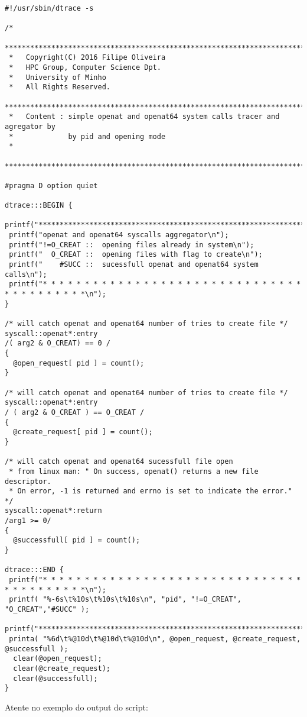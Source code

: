\documentclass[a4paper]{article}
\begin{document}
\begin{lstlisting}
#!/usr/sbin/dtrace -s

/*
 ********************************************************************************
 *   Copyright(C) 2016 Filipe Oliveira
 *   HPC Group, Computer Science Dpt.
 *   University of Minho
 *   All Rights Reserved.
 ********************************************************************************
 *   Content : simple openat and openat64 system calls tracer and agregator by
 *             by pid and opening mode
 *     
 ********************************************************************************/

#pragma D option quiet
 
dtrace:::BEGIN {
 printf("*********************************************************************************\n");
 printf("openat and openat64 syscalls aggregator\n");
 printf("!=O_CREAT ::  opening files already in system\n");
 printf("  O_CREAT ::  opening files with flag to create\n"); 
 printf("    #SUCC ::  sucessfull openat and openat64 system calls\n");
 printf("* * * * * * * * * * * * * * * * * * * * * * * * * * * * * * * * * * * * * * * * *\n");
}

/* will catch openat and openat64 number of tries to create file */
syscall::openat*:entry 
/( arg2 & O_CREAT) == 0 /
{
  @open_request[ pid ] = count();
}

/* will catch openat and openat64 number of tries to create file */
syscall::openat*:entry 
/ ( arg2 & O_CREAT ) == O_CREAT /
{
  @create_request[ pid ] = count();
}

/* will catch openat and openat64 sucessfull file open
 * from linux man: " On success, openat() returns a new file descriptor. 
 * On error, -1 is returned and errno is set to indicate the error."  */
syscall::openat*:return
/arg1 >= 0/
{
  @successfull[ pid ] = count();
}

dtrace:::END {
 printf("* * * * * * * * * * * * * * * * * * * * * * * * * * * * * * * * * * * * * * * * *\n");
 printf( "%-6s\t%10s\t%10s\t%10s\n", "pid", "!=O_CREAT", "O_CREAT","#SUCC" );
 printf("*********************************************************************************\n");
 printa( "%6d\t%@10d\t%@10d\t%@10d\n", @open_request, @create_request, @successfull );
  clear(@open_request);
  clear(@create_request);
  clear(@successfull);
}
 \end{lstlisting}

Atente no exemplo do output do script:
\end{document}
